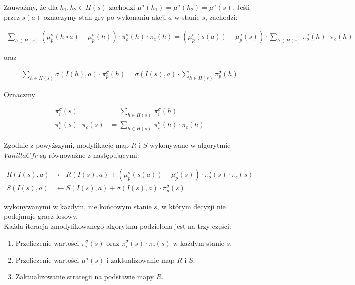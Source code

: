 \documentclass[licencjacka]{pracamgr}
\begin{document}
\noindent
Zauważmy, że dla $h_1, h_2 \in H(s)$ zachodzi $\mu^{\sigma}(h_1) = \mu^{\sigma}(h_2) = \mu^{\sigma}(s)$.
Jeśli przez $s(a)$ oznaczymy stan gry po wykonaniu akcji $a$ w stanie $s$, zachodzi: 

\begin{align*}
\sum\limits_{h \in H(s)} (\mu_p^{\sigma}(h \circ a) - \mu_p^{\sigma}(h)) \cdot \pi_o^{\sigma}(h) \cdot \pi_c(h) =
(\mu_p^{\sigma}(s(a)) - \mu_p^{\sigma}(s)) \cdot \sum\limits_{h \in H(s)} \pi_o^{\sigma}(h) \cdot \pi_c(h)
\end{align*}

\noindent
oraz

\begin{align*}
\sum\limits_{h \in H(s)} \sigma(I(h), a) \cdot \pi_p^{\sigma}(h) =
\sigma(I(s), a) \cdot \sum\limits_{h \in H(s)} \pi_p^{\sigma}(h)
\end{align*}

\noindent
Oznaczmy

\begin{align*}
\pi_i^{\sigma}(s) &= \sum\limits_{h \in H(s)} \, \pi_i^{\sigma}(h) \\
\pi_i^{\sigma}(s) \cdot \pi_c(s) &= \sum\limits_{h \in H(s)} \, \pi_i^{\sigma}(h) \cdot \pi_c(h)
\end{align*}

\noindent
Zgodnie z powyższymi, modyfikacje map $R$ i $S$ wykonywane w algorytmie $VanillaCfr$ są
równoważne z następującymi:

\begin{align*}
R(I(s), a) &\leftarrow R(I(s), a) + (\mu_p^{\sigma}(s(a)) - \mu_p^{\sigma}(s)) \cdot \pi_{o}^{\sigma}(s) \cdot \pi_c(s) \\
S(I(s), a) &\leftarrow S(I(s), a) + \sigma(I(s), a) \cdot \pi_p^{\sigma}(s)
\end{align*}

\noindent
wykonywanymi w każdym, nie końcowym stanie $s$, w którym decyzji nie podejmuje gracz losowy. \\

\noindent
Każda iteracja zmodyfikowanego algorytmu podzielona jest na trzy części:
\begin{enumerate}
\item Przeliczenie wartości $\pi_i^{\sigma}(s)$ oraz $\pi_i^{\sigma}(s) \cdot \pi_c(s)$ w każdym stanie $s$.
\item Przeliczenie wartości $\mu^{\sigma}(s)$ i zaktualizowanie map $R$ i $S$.
\item Zaktualizowanie strategii na podstawie mapy $R$.
\end{enumerate}
\end{document}
